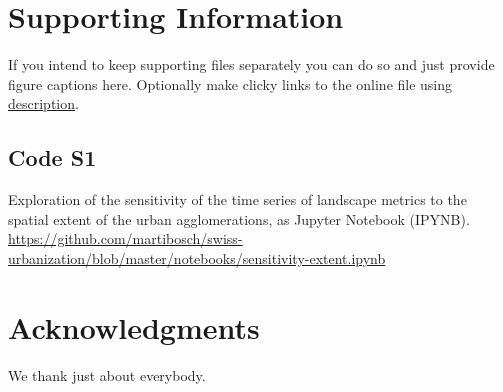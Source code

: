 \documentclass[10pt,letterpaper]{article}
\begin{document}

\section*{Supporting Information}
If you intend to keep supporting files separately you can do so and just provide figure captions here. Optionally make clicky links to the online file using \href{url}{description}.

\setcounter{figure}{0}
\renewcommand{\thefigure}{S\arabic{figure}}

\subsection*{Code S1}
\label{code-sensitivity}
Exploration of the sensitivity of the time series of landscape metrics to the spatial extent of the urban agglomerations, as Jupyter Notebook (IPYNB).
\url{https://github.com/martibosch/swiss-urbanization/blob/master/notebooks/sensitivity-extent.ipynb}



\section*{Acknowledgments}
We thank just about everybody.

\nolinenumbers




\end{document}
